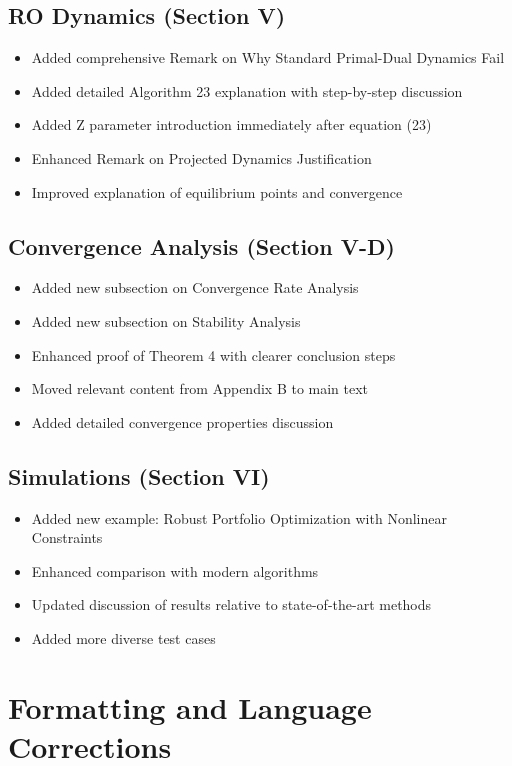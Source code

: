 \documentclass[11pt]{article}
\begin{document}
\subsection{RO Dynamics (Section V)}
\begin{itemize}
\item Added comprehensive Remark on Why Standard Primal-Dual Dynamics Fail
\item Added detailed Algorithm 23 explanation with step-by-step discussion
\item Added Z parameter introduction immediately after equation (23)
\item Enhanced Remark on Projected Dynamics Justification
\item Improved explanation of equilibrium points and convergence
\end{itemize}

\subsection{Convergence Analysis (Section V-D)}
\begin{itemize}
\item Added new subsection on Convergence Rate Analysis
\item Added new subsection on Stability Analysis
\item Enhanced proof of Theorem 4 with clearer conclusion steps
\item Moved relevant content from Appendix B to main text
\item Added detailed convergence properties discussion
\end{itemize}

\subsection{Simulations (Section VI)}
\begin{itemize}
\item Added new example: Robust Portfolio Optimization with Nonlinear Constraints
\item Enhanced comparison with modern algorithms
\item Updated discussion of results relative to state-of-the-art methods
\item Added more diverse test cases
\end{itemize}

\section{Formatting and Language Corrections}
\end{document}
